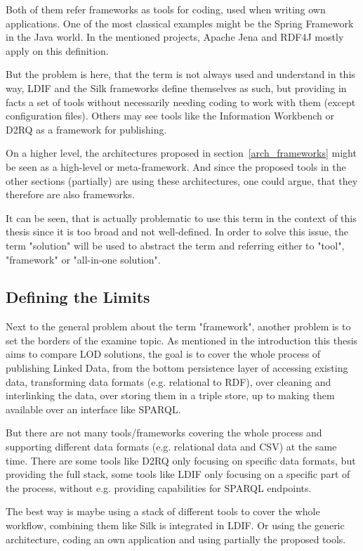 Both of them refer frameworks as tools for coding, used when writing own applications. One of the most classical examples might be the Spring Framework in the Java world. In the mentioned projects, Apache Jena and RDF4J mostly apply on this definition.

But the problem is here, that the term is not always used and understand in this way, LDIF and the Silk frameworks define themselves as such, but providing in facts a set of tools without necessarily needing coding to work with them (except configuration files). Others may see tools like the Information Workbench or D2RQ as a framework for publishing.

On a higher level, the architectures proposed in section~\ref{arch_frameworks} might be seen as a high-level or meta-framework. And since the proposed tools in the other sections (partially) are using these architectures, one could argue, that they therefore are also frameworks.

It can be seen, that is actually problematic to use this term in the context of this thesis since it is too broad and not well-defined. In order to solve this issue, the term "solution" will be used to abstract the term and referring either to "tool", "framework" or "all-in-one solution".

\subsection{Defining the Limits}

Next to the general problem about the term "framework", another problem is to set the borders of the examine topic. As mentioned in the introduction this thesis aims to compare LOD solutions, the goal is to cover the whole process of publishing Linked Data, from the bottom persistence layer of accessing existing data, transforming data formats (e.g. relational to RDF), over cleaning and interlinking the data, over storing them in a triple store, up to making them available over an interface like SPARQL.

But there are not many tools/frameworks covering the whole process and supporting different data formats (e.g. relational data and CSV) at the same time. There are some tools like D2RQ only focusing on specific data formats, but providing the full stack, some tools like LDIF only focusing on a specific part of the process, without e.g. providing capabilities for SPARQL endpoints.

The best way is maybe using a stack of different tools to cover the whole workflow, combining them like Silk is integrated in LDIF. Or using the generic architecture, coding an own application and using partially the proposed tools.

